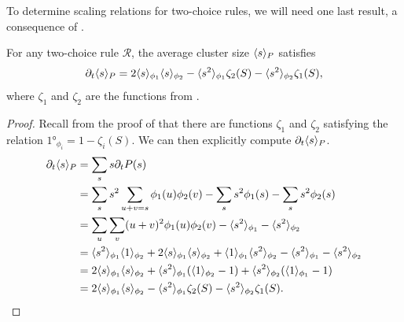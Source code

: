 \documentclass[twoside,10pt]{article}
\begin{document}
To determine scaling relations for two-choice rules, we will need one last result, a consequence of .

\begin{cor}
	\label{2c-sdel-sp}
	For any two-choice rule $\mathcal{R}$, the average cluster size $\langle s \rangle_{P}$ satisfies
\[
        \partial_{t}{\langle s \rangle_{P}} = 2\langle s \rangle_{\phi_1}\langle s \rangle_{\phi_2} - \langle s^2 \rangle_{\phi_1}\zeta_2(S) - \langle s^2 \rangle_{\phi_2}\zeta_1(S),
\]
where $\zeta_1$ and $\zeta_2$ are the functions from .
\end{cor}
\begin{proof}
	Recall from the proof of  that there are functions $\zeta_1$ and $\zeta_2$ satisfying the relation $\ang{1}_{\phi_i} = 1-\zeta_i(S)$. We can then explicitly compute $\partial_{t}{\langle s \rangle_{P}} $.
        \begin{align*}
                \partial_{t}{\langle s \rangle_{P}} &= \sum_s s \partial_{t}{P(s)} \\
                                    &= \sum_s s^2 \sum_{u+v=s}\phi_1(u)\phi_2(v) - \sum_s s^2 \phi_1(s) - \sum_s s^2 \phi_2(s) \\
                                    &= \sum_{u}\sum_{v} (u+v)^2\phi_1(u) \phi_2(v) - \langle s^2 \rangle_{\phi_1}-\langle s^2 \rangle_{\phi_2} \\
                                    &= \langle s^2 \rangle_{\phi_1}\langle 1 \rangle_{\phi_2} + 2\langle s \rangle_{\phi_1}\langle s \rangle_{\phi_2} + \langle 1 \rangle_{\phi_1}\langle s^2 \rangle_{\phi_2}- \langle s^2 \rangle_{\phi_1}-\langle s^2 \rangle_{\phi_2} \\
                                    &= 2\langle s \rangle_{\phi_1}\langle s \rangle_{\phi_2} + \langle s^2 \rangle_{\phi_1}(\langle 1 \rangle_{\phi_2} - 1) + \langle s^2 \rangle_{\phi_2}(\langle 1 \rangle_{\phi_1}-1) \\
                                    &= 2\langle s \rangle_{\phi_1}\langle s \rangle_{\phi_2} - \langle s^2 \rangle_{\phi_1}\zeta_2(S) - \langle s^2 \rangle_{\phi_2}\zeta_1(S).
        \end{align*}
\end{proof}
\end{document}
